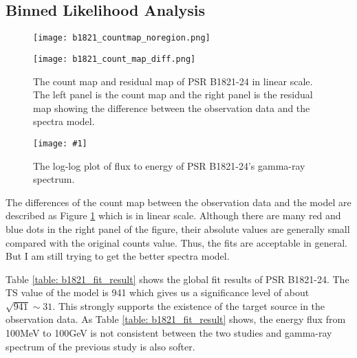 \documentclass[12pt]{report}
\newcommand{\singleFig}[3]{
  \begin{figure}[!htp]
    \centering
    \texttt{[image: \#1]}
    \caption{#3}
    \label{fig: #1}
  \end{figure}
}
\begin{document}
    \subsection{Binned Likelihood Analysis}
      \begin{figure}[!ht]
        \begin{center}
        \begin{minipage}{0.45\textwidth}
          \begin{center} 
            \texttt{[image: b1821\_countmap\_noregion.png]}
          \end{center}
        \end{minipage}
        \begin{minipage}{0.45\textwidth}
          \begin{center}
            \texttt{[image: b1821\_count\_map\_diff.png]}
          \end{center}
        \end{minipage}
      \end{center}
      \caption{The count map and residual map of PSR B1821-24 in linear scale. 
        The left panel is the count map and the right panel is the residual map showing the 
        difference between the observation data and the spectra model.}
        \label{fig: b1821_count_map_diff.png}
      \end{figure}

      \singleFig{b1821_cur.png}{0.37}{The log-log plot of flux to energy of 
        PSR B1821-24's gamma-ray spectrum. }
      \vspace{1cm}

      The differences of the count map between the observation data and the model are described 
      as Figure \ref{fig: b1821_count_map_diff.png} which is in linear scale. Although there are 
      many red and blue dots in the right panel of the figure, their absolute values are 
      generally small compared with the original counts value.
      Thus, the fits are acceptable in general. But I am still trying to get the better spectra 
      model. 

      Table \ref{table: b1821_fit_result} shows the global fit results of PSR B1821-24. 
      The TS value of the model is 941 which gives us a significance level 
      of about $\sqrt{941} \sim 31$. This strongly supports the existence of the target source in 
      the observation data. As Table \ref{table: b1821_fit_result} shows, the energy flux from 
      100MeV to 100GeV is not consistent between the two studies and gamma-ray spectrum of the 
      previous study is also softer. \citep{2013ApJ...778..106J} 
\end{document}
